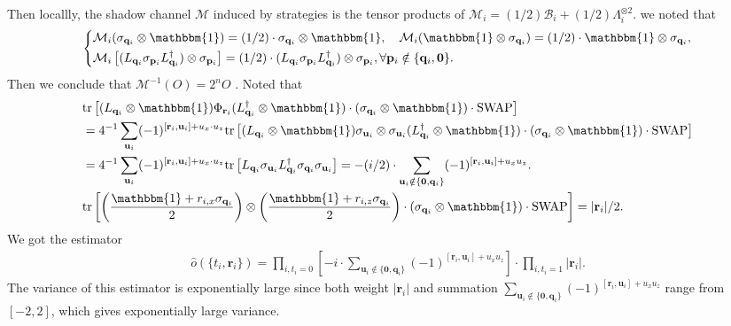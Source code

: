 \documentclass[aps,%
twocolumn,%
floatfix,%
pra,%
amsfonts,%
groupedaddress,%
superscriptaddress]{revtex4-2}%
\newcommand{\1}{\mathbbm{1}}
\begin{document}
 Then locallly, the shadow channel $\mathcal{M}$ induced by strategies is the tensor products of $\mathcal{M}_i = ({1}/{2}) \mathcal{B}_i + (1/2)\Lambda^{\otimes 2}_{i}$.
we noted that
  \begin{align}
      \left\{
      \begin{aligned}
      &\mathcal{M}_i(\sigma_{\mathbf{q}_i} \otimes \1) = (1/2)\cdot \sigma_{\mathbf{q}_i} \otimes \1,\quad \mathcal{M}_i( \1\otimes\sigma_{\mathbf{q}_i}) =(1/2)\cdot \1\otimes\sigma_{\mathbf{q}_i}, \\
      &\mathcal{M}_i\left[(L_{\mathbf{q}_i}\sigma_{\mathbf{p}_i}L_{\mathbf{q}_i}^{\dagger}) \otimes \sigma_{\mathbf{p}_i}\right]=(1/2)\cdot(L_{\mathbf{q}_i}\sigma_{\mathbf{p}_i}L_{\mathbf{q}_i}^{\dagger}) \otimes \sigma_{\mathbf{p}_i},\forall \mathbf{p}_i \notin \{\mathbf{q}_i,\mathbf{0}\}.\\
      \end{aligned}
      \right.
  \end{align}
    Then we conclude that $\mathcal{M}^{-1}(O) = 2^n O$ .
    Noted that
    \begin{align}
        &\mathrm{tr}\left[(L_{\mathbf{q}_i} \otimes \1)\Phi_{\mathbf{r}_i}(L^\dagger_{\mathbf{q}_i} \otimes \1) \cdot (\sigma_{\mathbf{q}_i} \otimes \1)\cdot \mathrm{SWAP}\right] \\
        &= 4^{-1}\sum_{\mathbf{u}_i} (-1)^{[\mathbf{r}_i, \mathbf{u}_i] +{u}_x\cdot {u}_z}\mathrm{tr}\left[(L_{\mathbf{q}_i} \otimes \1)\sigma_{\mathbf{u}_i} \otimes \sigma_{\mathbf{u}_i} (L^\dagger_{\mathbf{q}_i} \otimes \1) \cdot (\sigma_{\mathbf{q}_i} \otimes \1)\cdot \mathrm{SWAP}\right]\\
        &=4^{-1}\sum_{\mathbf{u}_i} (-1)^{[\mathbf{r}_i, \mathbf{u}_i] +{u}_x\cdot {u}_z}\mathrm{tr}\left[L_{\mathbf{q}_i} \sigma_{\mathbf{u}_i} L_{\mathbf{q}_i}^\dagger \sigma_{\mathbf{q}_i}\sigma_{\mathbf{u}_i}\right]=-(i/2)\cdot \sum_{\mathbf{u}_i \notin \{\mathbf{0}, \mathbf{q}_i\}} (-1)^{[\mathbf{r}_i, \mathbf{u}_i] + u_xu_z}.\\
        &\mathrm{tr}\left[\left(\frac{ \1 + r_{i,x} \sigma_{\mathbf{q}_i}}{2}\right)\otimes  \left(\frac{ \1 + r_{i,z} \sigma_{\mathbf{q}_i}}{2}\right)\cdot (\sigma_{\mathbf{q}_i} \otimes \1)\cdot \mathrm{SWAP}\right]=|\mathbf{r}_i|/2.
    \end{align}
    We got the estimator
    \begin{align}
        \hat{o}(\{t_i,\mathbf{r}_i\}) =\prod_{i, t_i= 0}\left[-i\cdot \sum_{\mathbf{u}_i \notin \{\mathbf{0}, \mathbf{q}_i\}} (-1)^{[\mathbf{r}_i, \mathbf{u}_i] + u_xu_z} \right]\cdot \prod_{i, t_i= 1}|\mathbf{r}_i|  .
    \end{align}
The variance of this estimator is exponentially large since both weight $|\mathbf{r}_i|$ and summation $\sum_{\mathbf{u}_i \notin \{\mathbf{0}, \mathbf{q}_i\}} (-1)^{[\mathbf{r}_i, \mathbf{u}_i] + u_xu_z} $ range from $[-2,2]$, which gives exponentially large variance.
\end{document}
